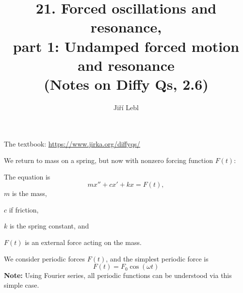 \documentclass[10pt,aspectratio=169]{beamer}
\author{Ji\v{r}\'i Lebl}
\institute[OSU]{%
Oklahoma State University%
}
\title{21. Forced oscillations and resonance, \\part 1: Undamped forced motion and resonance\\(Notes on Diffy Qs, 2.6)}
\date{}
\begin{document}
\begin{frame}
\titlepage


\begin{center}
The textbook: \url{https://www.jirka.org/diffyqs/}
\end{center}
\end{frame}

\begin{frame}
We return to mass on a spring, but now with nonzero forcing function $F(t)$:

\medskip

\hfill{}\hspace*{\fill}

\medskip
\pause

The equation is
\[
mx'' + cx' + kx = F(t) ,
\]
$m$ is the mass,

$c$ if friction,

$k$ is the spring constant, and

$F(t)$ is an external force acting on the mass.

\medskip
\pause

We consider periodic forces $F(t)$, and the simplest periodic
force is
\[
F(t) = F_0 \cos (\omega t)
\]
\pause
\textbf{Note:} Using Fourier series, all periodic functions can be understood
via this simple case.
\end{frame}
\end{document}
